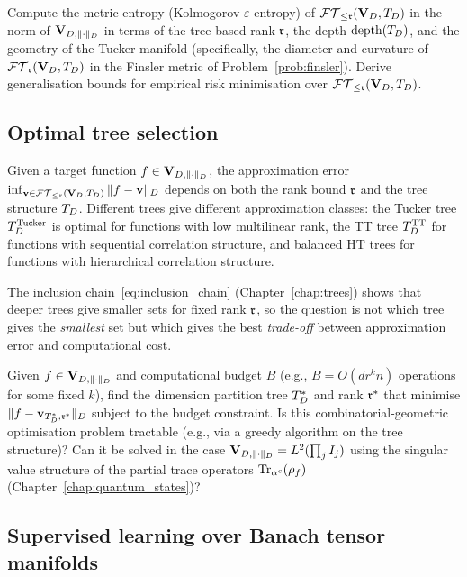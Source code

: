 \begin{problem}
\label{prob:learning}
Compute the metric entropy (Kolmogorov $\varepsilon$-entropy) of
$\mathcal{FT}_{\leq \mathfrak{r}}(\mathbf{V}_D,T_D)$ in the norm of $\mathbf{V}_{D,\|\cdot\|_D}$ in terms of the
tree-based rank $\mathfrak{r}$, the depth $\mathrm{depth}(T_D)$, and the geometry of
the Tucker manifold (specifically, the diameter and curvature of
$\mathcal{FT}_{\mathfrak{r}}(\mathbf{V}_D,T_D)$ in the Finsler metric of Problem~\ref{prob:finsler}).
Derive generalisation bounds for empirical risk minimisation over
$\mathcal{FT}_{\leq \mathfrak{r}}(\mathbf{V}_D,T_D)$.
\end{problem}

\subsection*{Optimal tree selection}

Given a target function $f \in \mathbf{V}_{D,\|\cdot\|_D}$, the approximation error
$\inf_{\mathbf{v} \in \mathcal{FT}_{\leq \mathfrak{r}}(\mathbf{V}_D,T_D)} \|f - \mathbf{v}\|_D$ depends on both
the rank bound $\mathfrak{r}$ and the tree structure $T_D$. Different trees
give different approximation classes: the Tucker tree $T_D^{\mathrm{Tucker}}$ is
optimal for functions with low multilinear rank, the TT tree $T_D^{\mathrm{TT}}$
for functions with sequential correlation structure, and balanced HT
trees for functions with hierarchical correlation structure.

The inclusion chain~\eqref{eq:inclusion_chain} (Chapter~\ref{chap:trees})
shows that deeper trees give smaller sets for fixed rank $\mathfrak{r}$, so the
question is not which tree gives the \emph{smallest} set but which
gives the best \emph{trade-off} between approximation error and
computational cost.

\begin{problem}
\label{prob:tree_selection}
Given $f \in \mathbf{V}_{D,\|\cdot\|_D}$ and computational budget $B$
(e.g., $B = O(dr^k n)$ operations for some fixed $k$), find the
dimension partition tree $T_D^*$ and rank $\mathfrak{r}^*$ that minimise
$\|f - \mathbf{v}_{T_D^*,\mathfrak{r}^*}\|_D$ subject to the budget constraint.
Is this combinatorial-geometric optimisation problem tractable (e.g.,
via a greedy algorithm on the tree structure)? Can it be solved in
the case $\mathbf{V}_{D,\|\cdot\|_D} = L^2(\prod_j I_j)$ using the singular value
structure of the partial trace operators $\mathrm{Tr}_{\alpha^c}(\rho_f)$
(Chapter~\ref{chap:quantum_states})?
\end{problem}

\subsection*{Supervised learning over Banach tensor manifolds}

